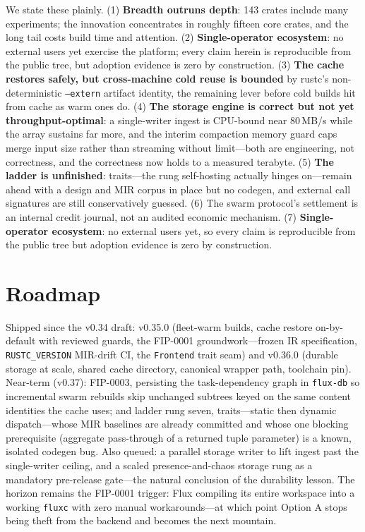 We state these plainly. (1) \textbf{Breadth outruns depth}: 143 crates include many experiments; the innovation concentrates in roughly fifteen core crates, and the long tail costs build time and attention. (2) \textbf{Single-operator ecosystem}: no external users yet exercise the platform; every claim herein is reproducible from the public tree, but adoption evidence is zero by construction. (3) \textbf{The cache restores safely, but cross-machine cold reuse is bounded} by rustc's non-deterministic \texttt{--extern} artifact identity, the remaining lever before cold builds hit from cache as warm ones do. (4) \textbf{The storage engine is correct but not yet throughput-optimal}: a single-writer ingest is CPU-bound near 80\,MB/s while the array sustains far more, and the interim compaction memory guard caps merge input size rather than streaming without limit---both are engineering, not correctness, and the correctness now holds to a measured terabyte. (5) \textbf{The ladder is unfinished}: traits---the rung self-hosting actually hinges on---remain ahead with a design and MIR corpus in place but no codegen, and external call signatures are still conservatively guessed. (6) The swarm protocol's settlement is an internal credit journal, not an audited economic mechanism. (7) \textbf{Single-operator ecosystem}: no external users yet, so every claim is reproducible from the public tree but adoption evidence is zero by construction.


\section{Roadmap}

Shipped since the v0.34 draft: v0.35.0 (fleet-warm builds, cache restore on-by-default with reviewed guards, the FIP-0001 groundwork---frozen IR specification, \texttt{RUSTC\_VERSION} MIR-drift CI, the \texttt{Frontend} trait seam) and v0.36.0 (durable storage at scale, shared cache directory, canonical wrapper path, toolchain pin). Near-term (v0.37): FIP-0003, persisting the task-dependency graph in \texttt{flux-db} so incremental swarm rebuilds skip unchanged subtrees keyed on the same content identities the cache uses; and ladder rung seven, traits---static then dynamic dispatch---whose MIR baselines are already committed and whose one blocking prerequisite (aggregate pass-through of a returned tuple parameter) is a known, isolated codegen bug. Also queued: a parallel storage writer to lift ingest past the single-writer ceiling, and a scaled presence-and-chaos storage rung as a mandatory pre-release gate---the natural conclusion of the durability lesson. The horizon remains the FIP-0001 trigger: Flux compiling its entire workspace into a working \texttt{fluxc} with zero manual workarounds---at which point Option A stops being theft from the backend and becomes the next mountain.


